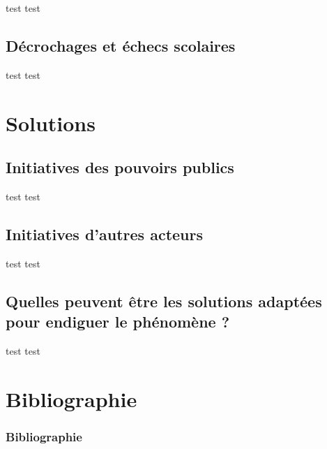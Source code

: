 \documentclass[utf8]{beamer}
\begin{document}
\begin{frame}{test}
test
\end{frame}

\subsection{Décrochages et échecs scolaires}

\begin{frame}{test}
test
\end{frame}



\section{Solutions}

\subsection{Initiatives des pouvoirs publics}

\begin{frame}{test}
test
\end{frame}

\subsection{Initiatives d'autres acteurs}

\begin{frame}{test}
test
\end{frame}

\subsection{Quelles peuvent être les solutions adaptées pour endiguer le phénomène ?}

\begin{frame}{test}
test
\end{frame}



\section{Bibliographie}

\begin{frame}[allowframebreaks]
\frametitle{Bibliographie}

\end{frame}
\end{document}
